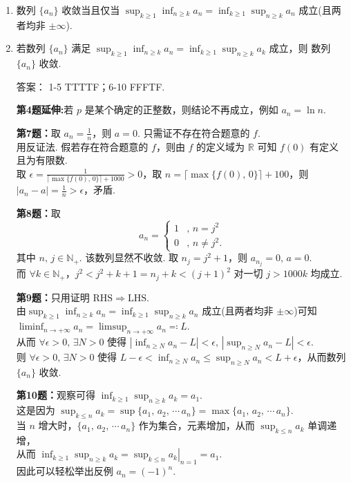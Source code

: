 \begin{enumerate}
    \item[9.]数列 $\{a_n\}$ 收敛当且仅当 $\displaystyle \sup_{k\geq 1}\inf_{n\geq k}a_n=\inf_{k\geq 1}\sup_{n\geq k}a_n$ 成立(且两者均非 $\pm\infty$).

    \item[10.]若数列 $\{a_n\}$ 满足 $\displaystyle\sup_{k\geq 1}\inf_{n\geq k}a_n=\inf_{k\geq 1}\sup_{n\geq k}a_k$ 成立，则
    数列 $\{a_n\}$ 收敛.

    \begin{solution}
        答案： 1-5 TTTTF；6-10 FFFTF.

        \textbf{第4题延伸:}若 $p$ 是某个确定的正整数，则结论不再成立，例如 $a_n=\ln n$.

        \textbf{第7题：}取 $\displaystyle a_n=\frac{1}{n}$，则 $a=0$. 只需证不存在符合题意的 $f$.\\
        用反证法. 假若存在符合题意的 $f$，则由 $f$ 的定义域为 $\mathbb{R}$ 可知 $f(0)$ 有定义且为有限数.\\
        取 $\displaystyle\epsilon=\frac{1}{\lceil\max\{f(0),\,0\}\rceil+1000}>0$，取 $n=\lceil\max\{f(0),\,0\}\rceil+100$，则 $\displaystyle \left| a_n-a \right|=\frac{1}{n}>\epsilon$，矛盾.

        \textbf{第8题：}取
        \[
        a_n=
        \begin{cases}
        1 &,\,n=j^2\\
        0 &,\,n\neq j^2.
        \end{cases}
        \]
        其中 $n,\,j \in\mathbb{N}_{+}$. 该数列显然不收敛. 取 $n_j=j^2+1$，则 $a_{n_j}=0,\,a=0$. \\
        而 $\forall k\in\mathbb{N}_{+}$，$j^2<j^2+k+1=n_j+k<(j+1)^2$ 对一切 $j>1000k$ 均成立.

        \textbf{第9题：}只用证明 $\mathrm{RHS}\Rightarrow\mathrm{LHS}$.\\
        由$\displaystyle \sup_{k\geq 1}\inf_{n\geq k}a_n=\inf_{k\geq 1}\sup_{n\geq k}a_n$ 成立(且两者均非 $\pm\infty$)可知 
        $\displaystyle \liminf_{n\to+\infty}a_n=\limsup_{n\to+\infty}a_n\eqqcolon L$.\\
        从而 $\forall \epsilon>0,\,\exists N>0$ 使得 $\displaystyle\left| \inf_{n\geq N}a_n-L \right|<\epsilon,\,\left| \sup_{n\geq N}a_n-L \right|<\epsilon$.\\
        则 $\forall \epsilon>0,\,\exists N>0$ 使得 $\displaystyle L-\epsilon<\inf_{n\geq N}a_n\leq \sup_{n\geq N}a_n<L+\epsilon$，从而数列 $\{a_n\}$ 收敛.

        \textbf{第10题：}观察可得 $\displaystyle \inf_{k\geq 1}\sup_{n\geq k}a_k=a_1$.\\
        这是因为 $\displaystyle \sup_{k\leq n}a_k=\sup\{a_1,\,a_2,\,\cdots\,a_n\}=\max\{a_1,\,a_2,\,\cdots\,a_n\}$.\\
        当 $n$ 增大时，$\{a_1,\,a_2,\,\cdots\,a_n\}$ 作为集合，元素增加，从而 $\displaystyle\sup_{k\leq n}a_k$ 单调递增，\\
        从而 $\displaystyle \left.\inf_{k\geq 1}\sup_{n\geq k}a_k=\sup_{k\leq n}a_k\right|_{n=1}=a_1$.\\
        因此可以轻松举出反例 $\displaystyle a_n=(-1)^n$.
    \end{solution}
\end{enumerate}
